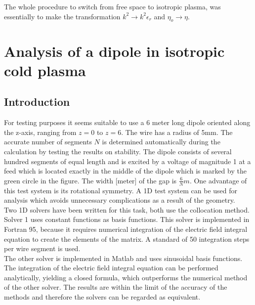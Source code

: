 \documentclass[two-coloumn,ras]{agutex}
\begin{document}
\begin{article}
The whole procedure to switch from free space to isotropic plasma, was essentially to make the transformation $k^2 \rightarrow k^2\epsilon_r$ and $\eta_o \rightarrow \eta$.\\


\section{Analysis of a dipole in isotropic cold plasma}
\subsection{Introduction}
For testing purposes it seems suitable to use a 6 meter long dipole oriented along the z-axis, ranging from $z=0$ to $z=6$. The wire has a radius of 5mm. The accurate number of segments $N$ is determined automatically during the calculation by testing the results on stability. The dipole consists of several hundred segments of equal length and is excited by a voltage of magnitude 1 at a feed which is located exactly in the middle of the dipole which is marked by the green circle in the figure. The width [meter] of the gap is $\frac{6}{N}m$. One advantage of this test system is its rotational symmetry. A 1D test system can be used for analysis which avoids unnecessary complications as a result of the geometry.\\

Two 1D solvers have been written for this task, both use the collocation method. Solver 1 uses constant functions as basis functions. This solver is implemented in Fortran 95, because it requires numerical integration of the electric field integral equation to create the elements of the matrix. A standard of 50 integration steps per wire segment is used.\\

The other solver is implemented in Matlab and uses sinusoidal basis functions. The integration of the electric field integral equation can be performed analytically, yielding a closed formula, which outperforms the numerical method of the other solver. The results are within the limit of the accuracy of the methods and therefore the solvers can be regarded as equivalent.\\



\end{article}
\end{document}

